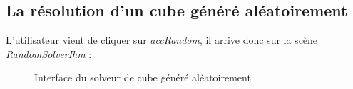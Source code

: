 \subsection{La résolution d'un cube généré aléatoirement}
L'utilisateur vient de cliquer sur \textit{accRandom}, il arrive donc sur la scène \textit{RandomSolverIhm} :

\begin{figure}[h]
\begin{center}
\end{center}
	\caption{Interface du solveur de cube généré aléatoirement}
\end{figure}

